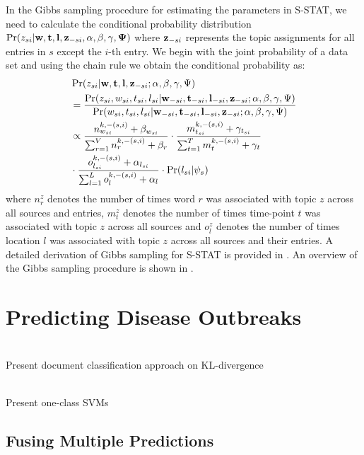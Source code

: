 \documentclass{sig-alternate}
\newcommand{\model}{{S-STAT}\xspace} %
\newcommand{\w}{{\bf w}}
\newcommand{\z}{{\bf z}}
\newcommand{\loc}{{\bf l}}
\newcommand{\tim}{{\bf t}}
\begin{document}
In the Gibbs sampling procedure for estimating the parameters in \model, we need to calculate the conditional probability distribution $\Pr(z_{si}|{\bf w},{\bf t}, {\bf l}, {\bf z}_{-si}, \alpha, \beta, \gamma, {\bf \Psi})$ where ${\bf z}_{-si}$ represents the topic assignments for all entries in $s$ except the $i$-th entry. We begin with the joint probability of a data set and using the chain rule we obtain the conditional probability as:
\begin{align}
&\Pr(z_{si}| \w,\tim,\loc,\z_{-si};\alpha,\beta,\gamma,\Psi) \nonumber \\
&= \frac{\Pr(z_{si}, w_{si}, t_{si}, l_{si}|\w_{-si},\tim_{-si},\loc_{-si},\z_{-si};\alpha,\beta,\gamma,\Psi)}{\Pr(w_{si}, t_{si}, l_{si}|\w_{-si},\tim_{-si},\loc_{-si},\z_{-si};\alpha,\beta,\gamma,\Psi)} \nonumber \\
& \propto \frac{n^{k,-(s,i)}_{w_{si}} + \beta_{w_{si}}}{\sum_{r = 1}^V n^{k,-(s,i)}_{r} + \beta_{r}} \cdot \frac{m^{k,-(s,i)}_{t_{si}} + \gamma_{t_{si}}}{\sum_{t = 1}^T m^{k,-(s,i)}_{t} + \gamma_{t}} \nonumber \\
& \cdot \frac{o^{k,-(s,i)}_{l_{si}} + \alpha_{l_{si}}}{\sum_{l = 1}^L o^{k,-(s,i)}_{l} + \alpha_{l}} \cdot \Pr(l_{si}|\psi_s) \nonumber
\end{align}
where $n^{z}_{r}$ denotes the number of times word $r$ was associated with topic $z$ across all sources and entries, $m^{z}_{t}$ denotes the number of times time-point $t$ was associated with topic $z$ across all sources and $o^z_l$ denotes the number of times location $l$ was associated with topic $z$ across all sources and their entries. A detailed derivation of Gibbs sampling for \model is provided in . An overview of the Gibbs sampling procedure is shown in .

\section{Predicting Disease Outbreaks}
\label{sec:pred}

\ \\Present document classification approach on KL-divergence

\ \\Present one-class SVMs

\subsection{Fusing Multiple Predictions}
\label{sec:integration}
\end{document}
